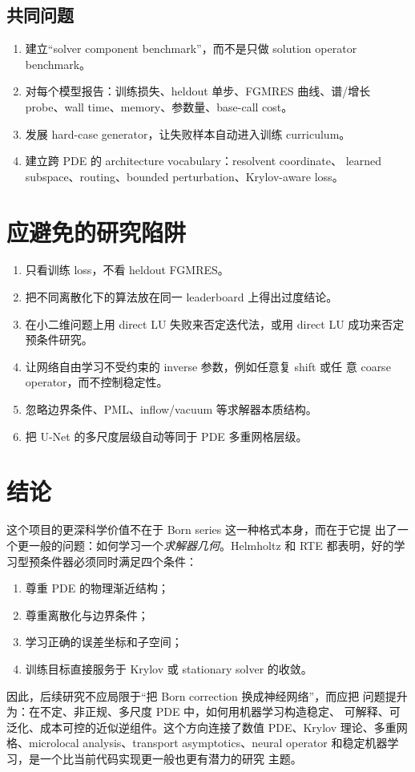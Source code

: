 \documentclass[UTF8,11pt,fontset=fandol]{ctexart}
\begin{document}
\subsection{共同问题}

\begin{enumerate}[leftmargin=2em]
  \item 建立“solver component benchmark”，而不是只做 solution operator
  benchmark。
  \item 对每个模型报告：训练损失、heldout 单步、FGMRES 曲线、谱/增长
  probe、wall time、memory、参数量、base-call cost。
  \item 发展 hard-case generator，让失败样本自动进入训练 curriculum。
  \item 建立跨 PDE 的 architecture vocabulary：resolvent coordinate、
  learned subspace、routing、bounded perturbation、Krylov-aware loss。
\end{enumerate}

\section{应避免的研究陷阱}

\begin{enumerate}[leftmargin=2em]
  \item 只看训练 loss，不看 heldout FGMRES。
  \item 把不同离散化下的算法放在同一 leaderboard 上得出过度结论。
  \item 在小二维问题上用 direct LU 失败来否定迭代法，或用 direct LU
  成功来否定预条件研究。
  \item 让网络自由学习不受约束的 inverse 参数，例如任意复 shift 或任
  意 coarse operator，而不控制稳定性。
  \item 忽略边界条件、PML、inflow/vacuum 等求解器本质结构。
  \item 把 U-Net 的多尺度层级自动等同于 PDE 多重网格层级。
\end{enumerate}

\section{结论}

这个项目的更深科学价值不在于 Born series 这一种格式本身，而在于它提
出了一个更一般的问题：如何学习一个\emph{求解器几何}。Helmholtz 和
RTE 都表明，好的学习型预条件器必须同时满足四个条件：

\begin{enumerate}[leftmargin=2em]
  \item 尊重 PDE 的物理渐近结构；
  \item 尊重离散化与边界条件；
  \item 学习正确的误差坐标和子空间；
  \item 训练目标直接服务于 Krylov 或 stationary solver 的收敛。
\end{enumerate}

因此，后续研究不应局限于“把 Born correction 换成神经网络”，而应把
问题提升为：在不定、非正规、多尺度 PDE 中，如何用机器学习构造稳定、
可解释、可泛化、成本可控的近似逆组件。这个方向连接了数值 PDE、Krylov
理论、多重网格、microlocal analysis、transport asymptotics、neural
operator 和稳定机器学习，是一个比当前代码实现更一般也更有潜力的研究
主题。
\end{document}
